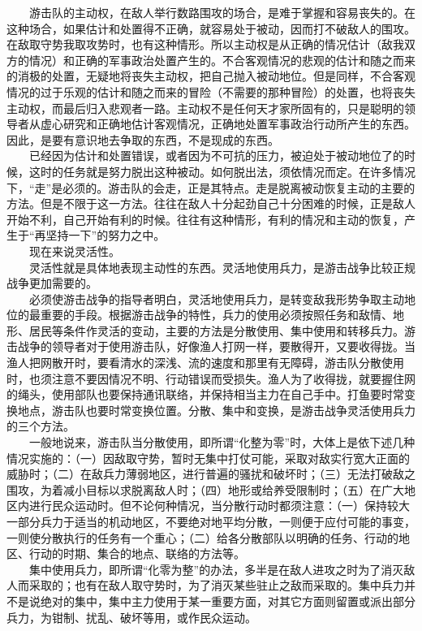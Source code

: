 \documentclass[cn,11pt,chinese]{elegantbook}
\begin{document}
　　游击队的主动权，在敌人举行数路围攻的场合，是难于掌握和容易丧失的。在这种场合，如果估计和处置得不正确，就容易处于被动，因而打不破敌人的围攻。在敌取守势我取攻势时，也有这种情形。所以主动权是从正确的情况估计（敌我双方的情况）和正确的军事政治处置产生的。不合客观情况的悲观的估计和随之而来的消极的处置，无疑地将丧失主动权，把自己抛入被动地位。但是同样，不合客观情况的过于乐观的估计和随之而来的冒险（不需要的那种冒险）的处置，也将丧失主动权，而最后归入悲观者一路。主动权不是任何天才家所固有的，只是聪明的领导者从虚心研究和正确地估计客观情况，正确地处置军事政治行动所产生的东西。因此，是要有意识地去争取的东西，不是现成的东西。\\
　　已经因为估计和处置错误，或者因为不可抗的压力，被迫处于被动地位了的时候，这时的任务就是努力脱出这种被动。如何脱出法，须依情况而定。在许多情况下，“走”是必须的。游击队的会走，正是其特点。走是脱离被动恢复主动的主要的方法。但是不限于这一方法。往往在敌人十分起劲自己十分困难的时候，正是敌人开始不利，自己开始有利的时候。往往有这种情形，有利的情况和主动的恢复，产生于“再坚持一下”的努力之中。\\
　　现在来说灵活性。\\
　　灵活性就是具体地表现主动性的东西。灵活地使用兵力，是游击战争比较正规战争更加需要的。\\
　　必须使游击战争的指导者明白，灵活地使用兵力，是转变敌我形势争取主动地位的最重要的手段。根据游击战争的特性，兵力的使用必须按照任务和敌情、地形、居民等条件作灵活的变动，主要的方法是分散使用、集中使用和转移兵力。游击战争的领导者对于使用游击队，好像渔人打网一样，要散得开，又要收得拢。当渔人把网散开时，要看清水的深浅、流的速度和那里有无障碍，游击队分散使用时，也须注意不要因情况不明、行动错误而受损失。渔人为了收得拢，就要握住网的绳头，使用部队也要保持通讯联络，并保持相当主力在自己手中。打鱼要时常变换地点，游击队也要时常变换位置。分散、集中和变换，是游击战争灵活使用兵力的三个方法。\\
　　一般地说来，游击队当分散使用，即所谓“化整为零”时，大体上是依下述几种情况实施的：（一）因敌取守势，暂时无集中打仗可能，采取对敌实行宽大正面的威胁时；（二）在敌兵力薄弱地区，进行普遍的骚扰和破坏时；（三）无法打破敌之围攻，为着减小目标以求脱离敌人时；（四）地形或给养受限制时；（五）在广大地区内进行民众运动时。但不论何种情况，当分散行动时都须注意：（一）保持较大一部分兵力于适当的机动地区，不要绝对地平均分散，一则便于应付可能的事变，一则使分散执行的任务有一个重心；（二）给各分散部队以明确的任务、行动的地区、行动的时期、集合的地点、联络的方法等。\\
　　集中使用兵力，即所谓“化零为整”的办法，多半是在敌人进攻之时为了消灭敌人而采取的；也有在敌人取守势时，为了消灭某些驻止之敌而采取的。集中兵力并不是说绝对的集中，集中主力使用于某一重要方面，对其它方面则留置或派出部分兵力，为钳制、扰乱、破坏等用，或作民众运动。\\
\end{document}
